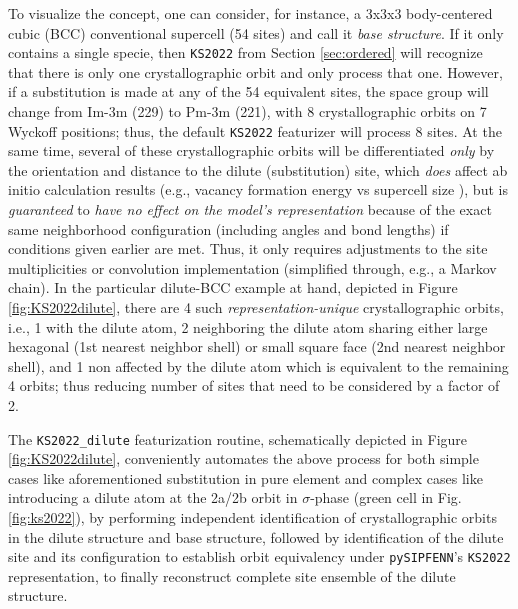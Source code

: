 To visualize the concept, one can consider, for instance, a 3x3x3 body-centered cubic (BCC) conventional supercell (54 sites) and call it \textit{base structure}. If it only contains a single specie, then \texttt{KS2022} from Section \ref{sec:ordered} will recognize that there is only one crystallographic orbit and only process that one. However, if a substitution is made at any of the 54 equivalent sites, the space group will change from Im-3m (229) to Pm-3m (221), with 8 crystallographic orbits on 7 Wyckoff positions; thus, the default \texttt{KS2022} featurizer will process 8 sites. 
At the same time, several of these crystallographic orbits will be differentiated \emph{only} by the orientation and distance to the dilute (substitution) site, which \emph{does} affect ab initio calculation results (e.g., vacancy formation energy vs supercell size \cite{Hargather2022ANi}), but is \emph{guaranteed} to \emph{have no effect on the model's representation} because of the exact same neighborhood configuration (including angles and bond lengths) if conditions given earlier are met. Thus, it only requires adjustments to the site multiplicities or convolution implementation (simplified through, e.g., a Markov chain). In the particular dilute-BCC example at hand, depicted in Figure \ref{fig:KS2022dilute}, there are 4 such \emph{representation-unique} crystallographic orbits, i.e., 1 with the dilute atom, 2 neighboring the dilute atom sharing either large hexagonal (1st nearest neighbor shell) or small square face (2nd nearest neighbor shell), and 1 non affected by the dilute atom which is equivalent to the remaining 4 orbits; thus reducing number of sites that need to be considered by a factor of 2.

The \texttt{KS2022\_dilute} featurization routine, schematically depicted in Figure \ref{fig:KS2022dilute}, conveniently automates the above process for both simple cases like aforementioned substitution in pure element and complex cases like introducing a dilute atom at the 2a/2b orbit in $\sigma$-phase (green cell in Fig. \ref{fig:ks2022}), by performing independent identification of crystallographic orbits in the dilute structure and base structure, followed by identification of the dilute site and its configuration to establish orbit equivalency under \texttt{pySIPFENN}'s \texttt{KS2022} representation, to finally reconstruct complete site ensemble of the dilute structure.

